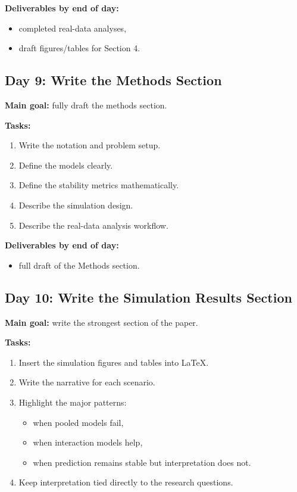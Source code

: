 \documentclass[11pt]{article}
\begin{document}
\textbf{Deliverables by end of day:}
\begin{itemize}
    \item completed real-data analyses,
    \item draft figures/tables for Section 4.
\end{itemize}

\subsection*{Day 9: Write the Methods Section}
\textbf{Main goal:} fully draft the methods section.

\textbf{Tasks:}
\begin{enumerate}[label=(\arabic*)]
    \item Write the notation and problem setup.
    \item Define the models clearly.
    \item Define the stability metrics mathematically.
    \item Describe the simulation design.
    \item Describe the real-data analysis workflow.
\end{enumerate}

\textbf{Deliverables by end of day:}
\begin{itemize}
    \item full draft of the Methods section.
\end{itemize}

\subsection*{Day 10: Write the Simulation Results Section}
\textbf{Main goal:} write the strongest section of the paper.

\textbf{Tasks:}
\begin{enumerate}[label=(\arabic*)]
    \item Insert the simulation figures and tables into LaTeX.
    \item Write the narrative for each scenario.
    \item Highlight the major patterns:
    \begin{itemize}
        \item when pooled models fail,
        \item when interaction models help,
        \item when prediction remains stable but interpretation does not.
    \end{itemize}
    \item Keep interpretation tied directly to the research questions.
\end{enumerate}
\end{document}
